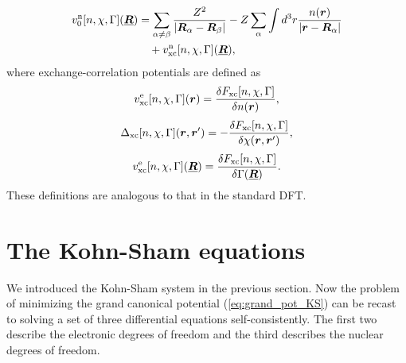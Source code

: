 %
\begin{equation} %
\begin{split}
	v^{\rm n}_0[n, \chi, \Gamma](\underline{\bm{R}}) &= \sum_{\alpha \neq \beta}
											\frac{Z^2}{|\bm{R}_\alpha - \bm{R}_\beta|}
										- Z\sum_{\alpha} \int d^3r \frac{n(\bm{r})}{|\bm{r} - \bm{R}_\alpha|} \\
										&\quad + v^{\rm n}_{\rm xc}[n, \chi, \Gamma](\underline{\bm{R}}),
\end{split}
\end{equation}
%
where exchange-correlation potentials are defined as 
%
\begin{equation}
	v^{\rm e}_{\rm xc}[n, \chi, \Gamma]({\bm r}) = \frac{\delta F_{\rm xc}[n, \chi, \Gamma]}{\delta n({\bm r})},
\end{equation}
%
\begin{equation}
	\Delta_{\rm xc}[n, \chi, \Gamma]({\bm r}, {\bm r'}) = - \frac{\delta F_{\rm xc}[n, \chi, \Gamma]}
							    {\delta \chi({\bm r}, {\bm r'})},
	\label{eq:Deltaxc}
\end{equation}
%
\begin{equation}
	v^{\rm e}_{\rm xc}[n, \chi, \Gamma](\underline{\bm{R}}) = \frac{\delta F_{\rm xc}[n, \chi, \Gamma]}
												{\delta \Gamma(\underline{\bm R})}.
\end{equation}
%
These definitions are analogous to that in the standard DFT.
%
%
\section{The Kohn-Sham equations}
%
We introduced the Kohn-Sham system in the previous section.
Now the problem of minimizing the grand canonical potential (\ref{eq:grand_pot_KS}) can be recast to
solving a set of three differential equations self-consistently.
The first two describe the electronic degrees of freedom and the third describes the nuclear degrees of freedom.
%

